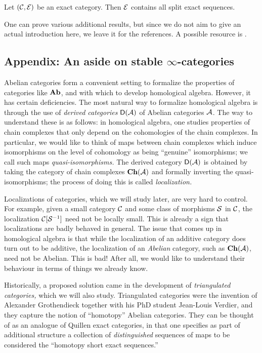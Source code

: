 \begin{corollary}
	Let \((\mathcal{C},\mathcal{E})\) be an exact category. Then \(\mathcal{E}\) contains all split exact sequences.
\end{corollary}

One can prove various additional results, but since we do not aim to give an actual introduction here, we leave it for the references. A possible resource is \cite{frerick2010exact}.



\subsection{Appendix: An aside on stable \(\infty\)-categories}
Abelian categories form a convenient setting to formalize the properties of categories like \(\mathbf{Ab}\), and with which to develop homological algebra. However,
it has certain deficiencies. The most natural way to formalize homological algebra is through the use of \emph{derived categories} \(\mathsf{D}(\mathcal{A})\) of Abelian
categories \(\mathcal{A}\). The way to understand these is as follows: in homological algebra, one studies properties of chain complexes that only depend on the cohomologies
of the chain complexes. In particular, we would like to think of maps between chain complexes which induce isomorphisms on the level of cohomology as being
``genuine'' isomorphisms; we call such maps \emph{quasi-isomorphisms.} The derived category \(\mathsf{D}(\mathcal{A})\) is obtained by taking the category of chain
complexes \(\mathbf{Ch}(\mathcal{A})\) and formally inverting the quasi-isomorphisms; the process of doing this is called \emph{localization.}

Localizations of categories, which we will study later, are very hard to control. For example, given a small category \(\mathcal{C}\) and some class of morphisms \(\mathcal{S}\) in \(\mathcal{C}\),
the localization \(\mathcal{C}[\mathcal{S}^{-1}]\) need not be locally small. This is already a sign that localizations are badly behaved in general. The issue that comes up in homological algebra
is that while the localization of an additive category does turn out to be additive, the localization of an \emph{Abelian} category, such as \(\mathbf{Ch}(\mathcal{A})\), need not be Abelian.
This is bad! After all, we would like to understand their behaviour in terms of things we already know.

Historically, a proposed solution came in the development of \emph{triangulated categories,} which we will also study. Triangulated categories were the invention of Alexander Grothendieck
together with his PhD student Jean-Louis Verdier, and they capture the notion of ``homotopy'' Abelian categories. They can be thought of as an analogue of Quillen exact categories, in that
one specifies as part of additional structure a collection of \emph{distinguished} sequences of maps to be considered the ``homotopy short exact sequences.''

